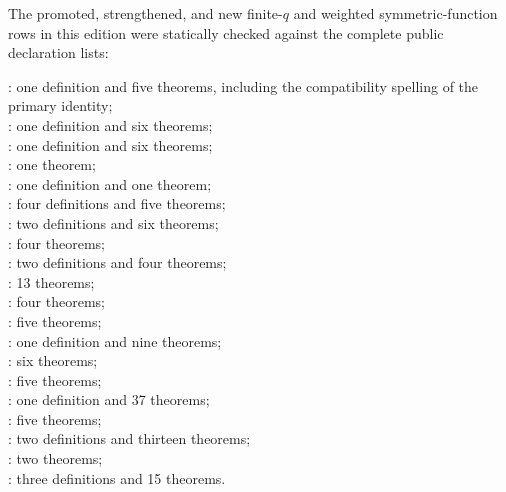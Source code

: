 \documentclass[11pt,a4paper,oneside,openany]{book}
\theoremstyle{definition}
\theoremstyle{remark}
\begin{document}
The promoted, strengthened, and new finite-$q$ and weighted
symmetric-function rows in this edition were statically checked against the
complete public declaration lists:
\begin{center}
\small
{}: one definition and five theorems, including the
compatibility spelling of the primary identity;\\
: one definition and six theorems;\\
: one definition and six theorems;\\
: one theorem;\\
: one definition and one theorem;\\
: four definitions and five theorems;\\
: two definitions and six theorems;\\
: four theorems;\\
: two definitions and four theorems;\\
: 13 theorems;\\
: four theorems;\\
: five theorems;\\
: one definition and nine theorems;\\
: six theorems;\\
: five theorems;\\
: one definition and 37 theorems;\\
: five theorems;\\
: two definitions and thirteen theorems;\\
: two theorems;\\
: three definitions and 15 theorems.
\end{center}
\end{document}
